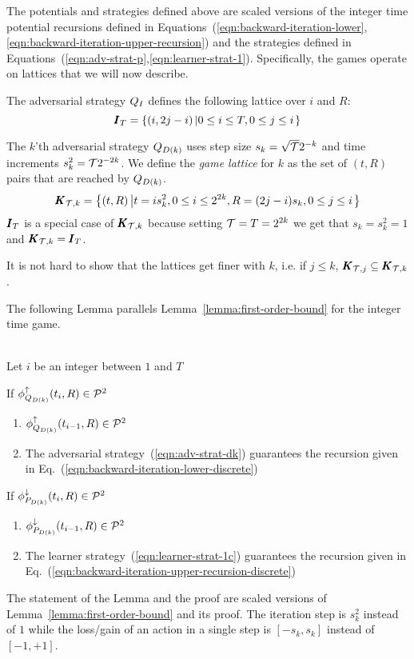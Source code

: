 \documentclass{article}[12pt]
\begin{document}
The potentials and strategies defined above are scaled versions of the
integer time potential recursions defined in
Equations~(\ref{eqn:backward-iteration-lower},\ref{eqn:backward-iteration-upper-recursion})
and the strategies defined in Equations~(\ref{eqn:adv-strat-p},\ref{eqn:learner-strat-1}). Specifically, the games operate on lattices that we will now describe.

The adversarial strategy $Q_I$ defines the following lattice over $i$ and $R$:
$$\pmb{I}_{T}=\left\{ (i,2j-i) \left| 0 \leq i \leq T, 0 \leq j \leq i\right. \right\}$$

The $k$'th adversarial strategy $Q_{D(k)}$ uses step size $s_k=\sqrt{\mathcal{T}} 2^{-k}$ and time
increments $s_k^2=\mathcal{T} 2^{-2k}$. We define the {\em game lattice}
for $k$ as the set of $(t,R)$ pairs that are reached by $Q_{D(k)}$.
\begin{equation}  \label{eqn:game-lattice}
  \pmb{K}_{{\mathcal{T},k}}=\left\{ (t,R) \left| t=i s_k^2, 0 \leq i \leq 2^{2k}, R=(2j-i)s_k, 0 \leq j \leq i\right. \right\}
  \end{equation}
$\pmb{I}_{T}$ is a special case of $\pmb{K}_{\mathcal{T},k}$ because setting
$\mathcal{T}=T=2^{2k}$ we get that $s_k=s_k^2=1$ and  $\pmb{K}_{\mathcal{T},k} = \pmb{I}_{T}$.

It is not hard to show that the lattices get finer with $k$, i.e. if  $j \leq k$,  $\pmb{K}_{\mathcal{T},j} \subseteq \pmb{K}_{\mathcal{T},k}$.

The following Lemma parallels Lemma~\ref{lemma:first-order-bound} for the integer time game.
\begin{lemma} \label{lemma:discrete-step-bound}
~\\
Let $i$ be an integer between $1$ and $T$

If $\phi_{Q_{D(k)}}^{\uparrow}(t_i,R) \in {\cal P}^{2}$
\begin{enumerate}
\item  $\phi_{Q_{D(k)}}^{\uparrow}(t_{i-1},R) \in {\cal P}^{2}$
\item The adversarial strategy~(\ref{eqn:adv-strat-dk})
  guarantees the recursion given in Eq.~(\ref{eqn:backward-iteration-lower-discrete})
\end{enumerate}

If $\phi_{P_{D(k)}}^{\downarrow}(t_i,R) \in {\cal P}^{2}$
\begin{enumerate}
\item $\phi_{P_{D(k)}}^{\downarrow}(t_{i-1},R) \in {\cal P}^{2}$
\item The learner strategy~(\ref{eqn:learner-strat-1c})
  guarantees the recursion given in Eq.~(\ref{eqn:backward-iteration-upper-recursion-discrete})
\end{enumerate}

\end{lemma}
\proof
The statement of the Lemma and the proof are scaled versions of
Lemma~\ref{lemma:first-order-bound} and its proof. The iteration step
is $s_k^2$ instead of $1$ while the loss/gain of an action in a single
step is $[-s_k,s_k]$ instead of $[-1,+1]$.
\end{document}
